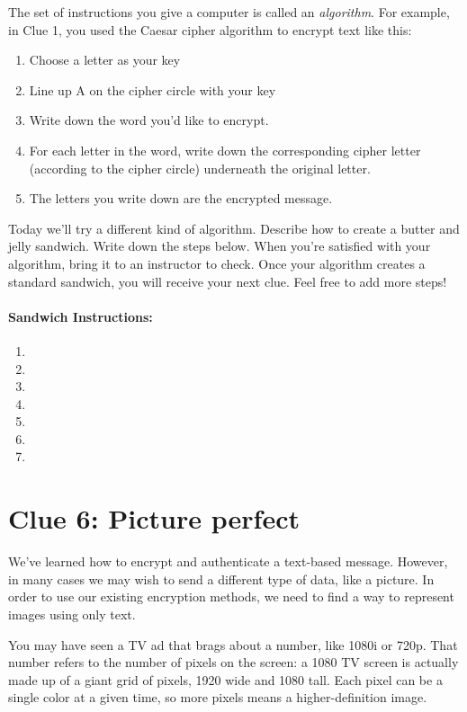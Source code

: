 \documentclass{article}
\begin{document}
The set of instructions you give a computer is called an \textit{algorithm}. For example, in Clue 1, you used the Caesar cipher algorithm to encrypt text like this:
\begin{enumerate}[noitemsep]
  \item Choose a letter as your key
  \item Line up A on the cipher circle with your key
  \item Write down the word you'd like to encrypt.
  \item For each letter in the word, write down the corresponding cipher letter (according to the cipher circle) underneath the original letter.
  \item The letters you write down are the encrypted message.
\end{enumerate}

Today we'll try a different kind of algorithm. Describe how to create a butter and jelly sandwich. Write down the steps below. When you're satisfied with your algorithm, bring it to an instructor to check. Once your algorithm creates a standard sandwich, you will receive your next clue. Feel free to add more steps!

\paragraph{Sandwich Instructions:}
\begin{enumerate}
  \item
  \item
  \item
  \item
  \item
  \item
  \item
\end{enumerate}

\newpage

\section*{Clue 6: Picture perfect}
We've learned how to encrypt and authenticate a text-based message. However, in many cases we may wish to send a different type of data, like a picture. In order to use our existing encryption methods, we need to find a way to represent images using only text.

You may have seen a TV ad that brags about a number, like 1080i or 720p. That number refers to the number of pixels on the screen: a 1080 TV screen is actually made up of a giant grid of pixels, 1920 wide and 1080 tall. Each pixel can be a single color at a given time, so more pixels means a higher-definition image.
\end{document}
